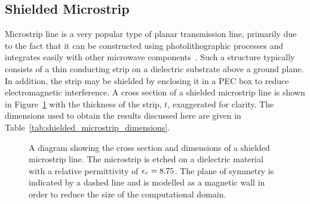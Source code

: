 \subsection{Shielded Microstrip}
\label{sec:shielded_microstrip}
Microstrip line is a very popular type of planar transmission line,
primarily due to the fact that it can be constructed using
photolithographic processes and integrates easily with other microwave
components~\cite{Poz2005}. Such a structure typically consists of a
thin conducting strip on a dielectric substrate above a ground
plane. In addition, the strip may be shielded by enclosing it in a PEC
box to reduce electromagnetic interference. A cross section of a
shielded microstrip line is shown in
Figure~\ref{fig:shielded_microstrip} with the thickness of the strip,
$t$, exaggerated for clarity. The dimensions used to obtain the
results discussed here are given in
Table~\ref{tab:shielded_microstrip_dimensions}.
\begin{figure}[t]
    \centering
    \caption{A diagram showing the cross section and dimensions of a shielded microstrip line.  The microstrip is etched on a dielectric material with a relative permittivity of $\epsilon_r = 8.75$.  The plane of symmetry is indicated by a dashed line and is modelled as a magnetic wall in order to reduce the size of the computational domain.}
    \label{fig:shielded_microstrip}
\end{figure}
